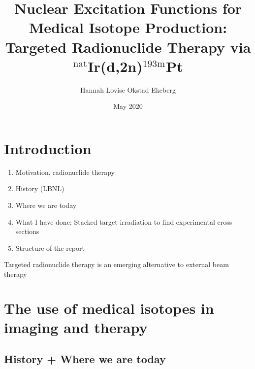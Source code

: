 \documentclass[a4paper,11pt,twoside]{book}
\title{Nuclear Excitation Functions for Medical Isotope Production: Targeted Radionuclide Therapy via $^{\text{nat}}$Ir(d,2n)$^{\text{193m}}$Pt}
\author{Hannah Lovise Okstad Ekeberg }
\date{May 2020}
\begin{document}
\maketitle

%
%
\tableofcontents
\newpage

\chapter{Introduction}\label{Chapter:Introduction}
\noindent




\noindent

\begin{enumerate}
    \item Motivation, radionuclide therapy
    \item History (LBNL)
    \item Where we are today 
    \item What I have done; Stacked target irradiation to find experimental cross sections
    \item Structure of the report
\end{enumerate}

Targeted radionuclide therapy is an emerging alternative to external beam therapy


\chapter{The use of medical isotopes in imaging and therapy}\label{Chapter:Medical_Isotopes}
\noindent


\section{History + Where we are today}
\end{document}
